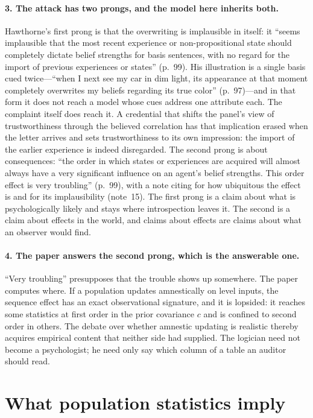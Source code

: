 \documentclass[11pt,a4paper]{article}
\begin{document}
\paragraph{3. The attack has two prongs, and the model here inherits both.}
Hawthorne's first prong is that the overwriting is implausible in itself: it
``seems implausible that the most recent experience or non-propositional state
should completely dictate belief strengths for basis sentences, with no regard
for the import of previous experiences or states'' (p.~99). His illustration is a
single basis cued twice---``when I next see my car in dim light, its appearance
at that moment completely overwrites my beliefs regarding its true color''
(p.~97)---and in that form it does not reach a model whose cues address one
attribute each. The complaint itself does reach it. A credential that shifts the
panel's view of trustworthiness through the believed correlation has that
implication erased when the letter arrives and sets trustworthiness to its own
impression: the import of the earlier experience is indeed disregarded. The
second prong is about consequences: ``the order in which states or experiences
are acquired will almost always have a very significant influence on an agent's
belief strengths. This order effect is very troubling'' (p.~99), with a note
citing \citet{DiaconisZabell1982} for how ubiquitous the effect is and
\citet{Doring1999} for its implausibility (note~15). The first prong is a claim
about what is psychologically likely and stays where introspection leaves it.
The second is a claim about effects in the world, and claims about effects are
claims about what an observer would find.

\paragraph{4. The paper answers the second prong, which is the answerable one.}
``Very troubling'' presupposes that the trouble shows up somewhere. The paper
computes where. If a population updates amnestically on level inputs, the
sequence effect has an exact observational signature, and it is lopsided: it
reaches some statistics at first order in the prior covariance $c$ and is
confined to second order in others. The debate over whether amnestic updating is
realistic thereby acquires empirical content that neither side had supplied. The
logician need not become a psychologist; he need only say which column of a
table an auditor should read.

\section*{What population statistics imply}
\end{document}
